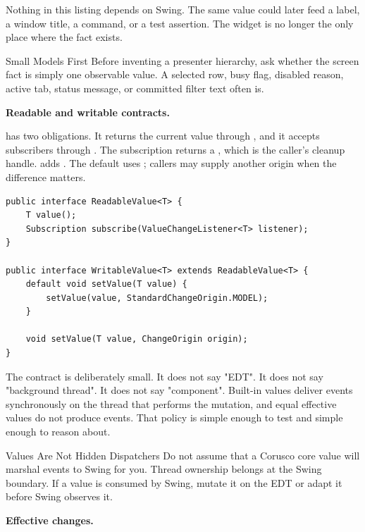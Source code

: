 Nothing in this listing depends on Swing. The same value could later feed a
label, a window title, a command, or a test assertion. The widget is no longer
the only place where the fact exists.

\begin{principlebox}{Small Models First}
Before inventing a presenter hierarchy, ask whether the screen fact is simply
one observable value. A selected row, busy flag, disabled reason, active tab,
status message, or committed filter text often is.
\end{principlebox}

\textbf{Readable and writable contracts.}

 has two obligations. It returns the current value through
, and it accepts subscribers through . The
subscription returns a , which is the caller's cleanup handle.
 adds . The default 
uses ; callers may supply another origin when the
difference matters.

\begin{lstlisting}[caption={The shape of the core contract.}]
public interface ReadableValue<T> {
    T value();
    Subscription subscribe(ValueChangeListener<T> listener);
}

public interface WritableValue<T> extends ReadableValue<T> {
    default void setValue(T value) {
        setValue(value, StandardChangeOrigin.MODEL);
    }

    void setValue(T value, ChangeOrigin origin);
}
\end{lstlisting}

The contract is deliberately small. It does not say "EDT". It does not say
"background thread". It does not say "component". Built-in values deliver events
synchronously on the thread that performs the mutation, and equal effective
values do not produce events. That policy is simple enough to test and simple
enough to reason about.

\begin{pitfallbox}{Values Are Not Hidden Dispatchers}
Do not assume that a Corusco core value will marshal events to Swing for you.
Thread ownership belongs at the Swing boundary. If a value is consumed by Swing,
mutate it on the EDT or adapt it before Swing observes it.
\end{pitfallbox}

\textbf{Effective changes.}

